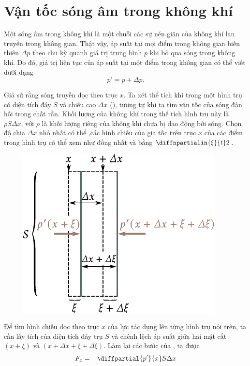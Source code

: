\section{Vận tốc sóng âm trong không khí}\label{sec:14_10}

Một sóng âm trong không khí là một chuỗi các sự nén giãn của không khí lan truyền trong không gian.
Thật vậy, áp suất tại mọi điểm trong không gian biến thiên $\Delta{p}$ theo chu kỳ quanh giá trị trung bình $p$ khi bỏ qua sóng trong không khí.
Do đó, giá trị liên tục của áp suất tại một điểm trong không gian có thể viết dưới dạng
\begin{equation*}
	p' = p + \Delta{p}.
\end{equation*}

Giả sử rằng sóng truyền dọc theo trục $x$.
Ta xét thể tích khí trong một hình trụ có diện tích đáy $S$ và chiều cao $\Delta{x}$ (), tương tự  khi ta tìm vận tốc của sóng đàn hồi trong chất rắn.
Khối lượng của không khí trong thể tích hình trụ này là $\rho S\Delta{x}$, với $\rho$ là khối lượng riêng của không khí chưa bị dao động bởi sóng.
Chọn độ chia $\Delta{x}$ nhỏ nhất có thể ,các hình chiếu của gia tốc trên trục $x$ của các điểm trong hình trụ có thể xem như đồng nhất và bằng $\diffnpartialin{\xi}{t}2$.

\begin{figure}[!htb]
	\begin{center}
		\includegraphics[scale=1]{figures/ch_14/fig_14_14.pdf}
		\caption[]{}
		\label{fig:14_14}
	\end{center}
	\vspace{-0.8cm}
\end{figure}

Để tìm hình chiếu dọc theo trục $x$ của lực tác dụng lên từng hình trụ nói trên, ta cần lấy tích của diện tích đáy trụ $S$ và chênh lệch áp suất giữa hai mặt cắt $(x+\xi)$ và $(x + \Delta{x} + \xi + \Delta{\xi})$. Làm lại các bước của , ta được
\begin{equation*}
	F_x = - \diffpartial{p'}{x} S \Delta{x}
\end{equation*}

